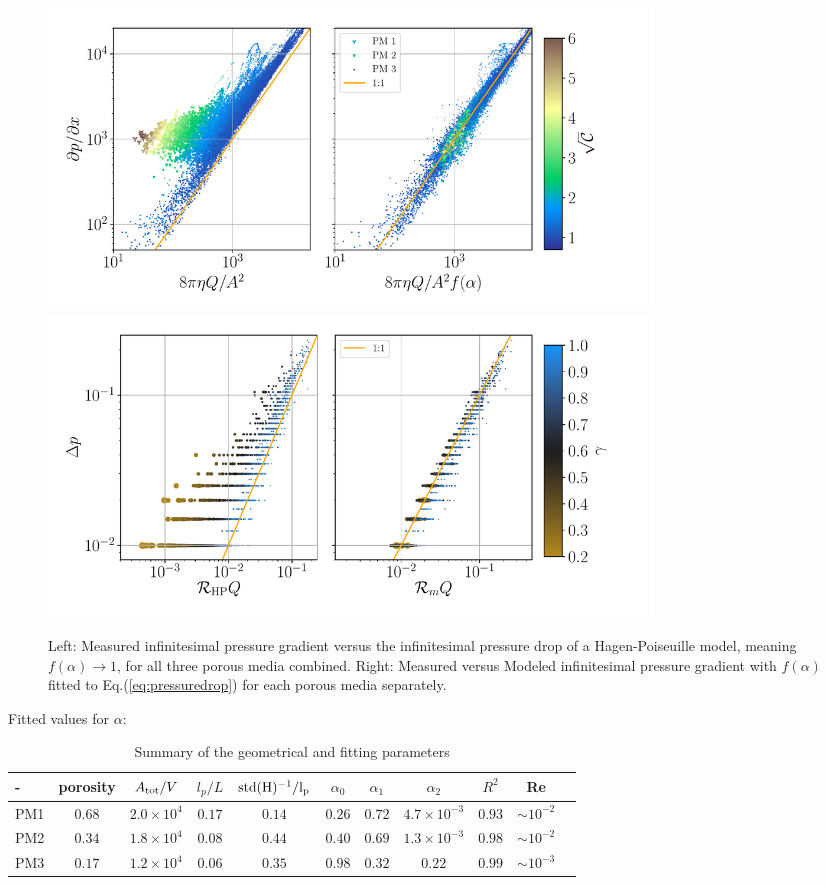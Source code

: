 \documentclass[draft]{agujournal2019}
\begin{document}
\begin{figure}\label{fig:local_and_integrated}
\includegraphics[height=8cm]{figures/infi_dpdx_combined.pdf}
\includegraphics[height=8cm]{figures/integral_dp_combined.pdf}
\caption{Left: Measured infinitesimal pressure gradient versus the infinitesimal pressure drop of a Hagen-Poiseuille model, meaning $f(\alpha)\rightarrow 1$, for all three porous media combined. Right: Measured versus Modeled infinitesimal pressure gradient with $f(\alpha)$ fitted to Eq.(\ref{eq:pressuredrop}) for each porous media separately.   }
\end{figure}

Fitted values for $\alpha $:


\begin{table}[htbp!]\label{tab:results}
\caption{Summary of the geometrical and fitting parameters}
\centering
\begin{tabular}{l|c|c|c|c|c|c|c|c|c|c}
- & porosity & $A_{\rm{tot}}/V$ & $ l_p/L$ &  $\rm{std}(H)^{-1}/l_p$& $\alpha_0$ & $\alpha_1$ & $\alpha_2$ & $R^2$ & Re\\
\hline
PM1 &$0.68$ & $2.0\times10^{4}$ & $0.17$ &  $0.14$& $0.26$ & $0.72$ & $4.7\times 10^{-3}$ &  $0.93$&$\sim 10^{-2}$\\
PM2 & $0.34$ & $1.8\times10^{4}$ & $0.08$ &  $0.44$& $0.40$ & $0.69$ & $1.3 \times 10^{-3}$ & $0.98$&$\sim10^{-2}$ \\
PM3 & $0.17$ & $1.2\times10^{4}$ & $0.06$ &  $0.35$& $0.98$ & $0.32$ & $0.22$ & $0.99$&$\sim10^{-3}$ \\
\end{tabular}
\end{table}
\end{document}
